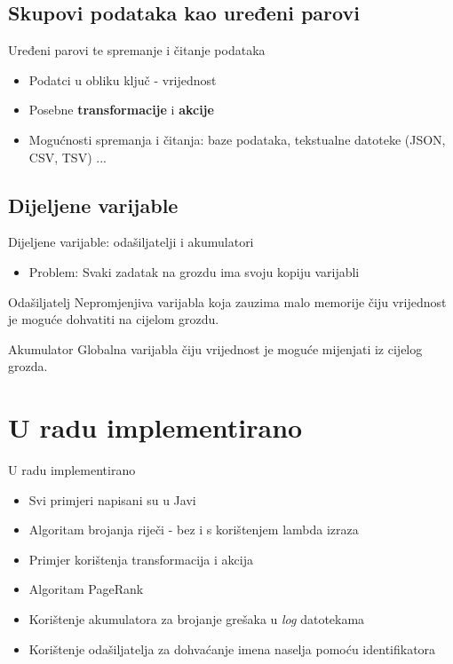 \documentclass{beamer}
\begin{document}
\subsection{Skupovi podataka kao uređeni parovi}
\begin{frame}{Uređeni parovi te spremanje i čitanje podataka}
  \begin{itemize}
  \item {
 	Podatci u obliku ključ - vrijednost
 	\pause
  }
  \item {
 	Posebne \textbf{transformacije} i \textbf{akcije}
 	\pause
  }
  \item {
 	Mogućnosti spremanja i čitanja: baze podataka, tekstualne datoteke (JSON, CSV, TSV) ...
  }  
  \end{itemize}
\end{frame}
\subsection{Dijeljene varijable}
\begin{frame}{Dijeljene varijable: odašiljatelji i akumulatori}
\begin{itemize}
  \item {
 	\alert{Problem: } Svaki zadatak na grozdu ima svoju kopiju varijabli
 	\pause
  }
\end{itemize}
\begin{block}{Odašiljatelj}
	Nepromjenjiva varijabla koja zauzima malo memorije čiju vrijednost je moguće dohvatiti na cijelom grozdu.
 \end{block}  
	
  \pause
  \begin{block}{Akumulator}
	Globalna varijabla čiju vrijednost je moguće mijenjati iz cijelog grozda.
  \end{block}
 \end{frame}
  
\section{U radu implementirano}
\begin{frame}{U radu implementirano}
\begin{itemize}
  \item {
 	Svi primjeri napisani su u Javi
 	\pause
  }
  \item {
 	Algoritam brojanja riječi - bez i s korištenjem lambda izraza
 	\pause
  }
  \item {
 	Primjer korištenja transformacija i akcija
 	\pause
  }
  \item {
 	Algoritam PageRank
 	\pause
  }
  \item {
 	Korištenje akumulatora za brojanje grešaka u \emph{log} datotekama
 	\pause
  }
  \item {
 	Korištenje odašiljatelja za dohvaćanje imena naselja pomoću identifikatora
 	\pause
  }
\end{itemize}
 \end{frame}
\end{document}
